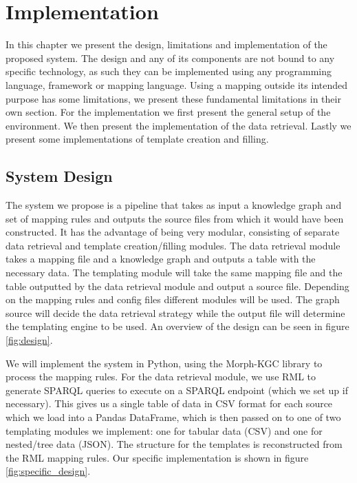\chapter{Implementation}
\label{chapter:implementation}
In this chapter we present the design, limitations and implementation of the proposed system. The design and any of its components are not bound to any specific technology, as such they can be implemented using any programming language, framework or mapping language. Using a mapping outside its intended purpose has some limitations, we present these fundamental limitations in their own section. For the implementation we first present the general setup of the environment. We then present the implementation of the data retrieval. Lastly we present some implementations of template creation and filling.

\section{System Design}
The system we propose is a pipeline that takes as input a knowledge graph and set of mapping rules and outputs the source files from which it would have been constructed. It has the advantage of being very modular, consisting of separate data retrieval and template creation/filling modules. The data retrieval module takes a mapping file and a knowledge graph and outputs a table with the necessary data. The templating module will take the same mapping file and the table outputted by the data retrieval module and output a source file. Depending on the mapping rules and config files different modules will be used. The graph source will decide the data retrieval strategy while the output file will determine the templating engine to be used. An overview of the design can be seen in figure \ref{fig:design}.

We will implement the system in Python, using the Morph-KGC library to process the mapping rules. For the data retrieval module, we use RML to generate SPARQL queries to execute on a SPARQL endpoint (which we set up if necessary). This gives us a single table of data in CSV format for each source which we load into a Pandas DataFrame, which is then passed on to one of two templating modules we implement: one for tabular data (CSV) and one for nested/tree data (JSON). The structure for the templates is reconstructed from the RML mapping rules. Our specific implementation is shown in figure \ref{fig:specific_design}.

